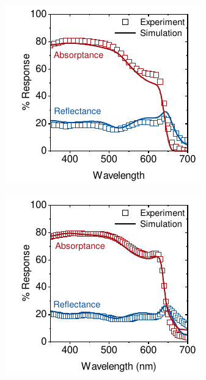 \begin{figure}[htbp]
    \centering
    \begin{subfigure}[t]{0.4\textwidth} %
        \centering
        \includegraphics[width=\textwidth]{chapters/ellipsometry/image/RT_As_Deposited.pdf} %
        \caption{}
        \label{fig:ellispometry:rt_as_dep}
    \end{subfigure}
    \hspace{1cm}
    \begin{subfigure}[t]{0.4\textwidth} %
        \centering
        \includegraphics[width=\textwidth]{chapters/ellipsometry/image/RT_Annealed.pdf} %
        \caption{}
        \label{fig:ellipsometry:RT_annealed}
    \end{subfigure}


\end{figure}
